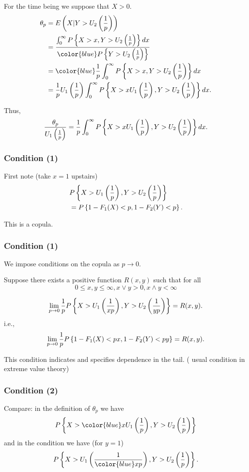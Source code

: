 \documentclass{beamer}
\begin{document}
\begin{frame}
    \frametitle{}
    For the time being we suppose that $X>0$.
    $$
\begin{aligned}
    \theta_p &= E\suit{X|Y>U_2\suit{\frac{1}{p}}} \\
    &= \frac{\int_{0}^{\infty}P\set{X>x,Y>U_2\suit{\frac{1}{p}}}dx}{{\color{blue}P\set{Y>U_2\suit{\frac{1}{p}}}}}  \\ 
    &={\color{blue}\frac{1}{p}}\int_{0}^{\infty} P\set{X>x, Y>U_2\suit{\frac{1}{p}}} dx\\
    &=\frac{1}{p}U_1\suit{\frac{1}{p}}\int_0^{\infty} P\set{X>x U_1\suit{\frac{1}{p}}, Y>U_2\suit{\frac{1}{p}}}dx.
\end{aligned}
$$
    
Thus,
$$
\frac{\theta_p}{U_1\left(\frac{1}{p}\right)} = \frac{1}{p}\int_0^{\infty} P\left\{X>x U_1\left(\frac{1}{p}\right), Y>U_2\left(\frac{1}{p}\right)\right\}dx.
$$

\end{frame}


\begin{frame}
    \frametitle{Condition (1)}


 First note (take $x=1$ upstairs)
$$
\begin{aligned}
&P\left\{X>U_1\left(\frac{1}{p}\right),Y>U_2\left(\frac{1}{p}\right)\right\}\\
&=P\left\{1-F_1(X)<p,1-F_2(Y)<p\right\}.
\end{aligned}
$$

\vspace{5ex}

This is a copula.
\end{frame}


\begin{frame}
    \frametitle{Condition (1)}
We impose conditions on the copula as $p\to 0$.
\medskip

Suppose there exists a positive function $R(x,y)$ such that for all
$$
0\le x,y\le \infty, x\lor y>0, x\wedge y<\infty
$$

$$
\lim_{p\to 0} \frac{1}{p} P\left\{X>U_1\left(\frac{1}{xp}\right), Y>U_2\left(\frac{1}{yp}\right)\right\} = R(x,y).
$$
i.e.,
$$
\lim_{p\to 0} \frac{1}{p} P\left\{1-F_1(X)<px, 1-F_2(Y)<py\right\} = R(x,y).
$$
    
This condition indicates and specifies {\color{blue} dependence  in the tail.}  ( usual condition in extreme value theory)
\end{frame}


\begin{frame}
    \frametitle{Condition (2)}
    Compare: in the definition of $\theta_p$ we have
    $$
P\set{X>{\color{blue} x}U_1\suit{\frac{1}{p}}, Y>U_2\suit{\frac{1}{p}}}
    $$
and in the condition we have (for $y=1$)
$$
P\set{X>U_1\suit{\frac{ 1}{{\color{blue} x} p}}, Y>U_2\suit{\frac{1}{p}}}.
    $$
\end{frame}
\end{document}

